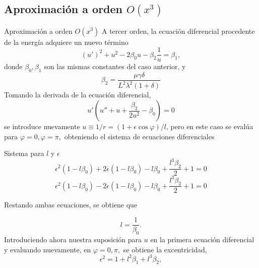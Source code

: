 \documentclass{beamer}
\begin{document}
	\subsection{Aproximación a orden $O(x^3)$}
	\begin{frame}[allowframebreaks]{Aproximación a orden $O(x^3)$}
	A tercer orden, la ecuación diferencial procedente de la energía adquiere un nuevo término
	\begin{equation}
		(u')^2+u^2-2\beta_0 u-\beta_2\frac{1}{u}=\beta_1,
	\end{equation}
	donde $\beta_0, \beta_1$ son las mismas constantes del caso anterior, y
	$$\beta_2=\frac{\mu\gamma\delta}{L^2\lambda^2(1+\delta)}$$
	Tomando la derivada de la ecuación diferencial,
	\begin{equation}
		u'(u''+u+\frac{\beta_2}{2u^2}-\beta_0)=0
	\end{equation}
	se introduce nuevamente $u\equiv 1/r=(1+\epsilon\cos\varphi)/l$, pero en este caso se evalúa para $\varphi=0,\varphi=\pi,$ obteniendo el sistema de ecuaciones diferenciales\vspace{10cm}
	\begin{block}{Sistema para $l$ y $\epsilon$}
				\begin{equation}
		\epsilon^2(1-l\beta_0)+2\epsilon(1-l\beta_0)-l\beta_0+\frac{l^3\beta_2}{2}+1=0
		\end{equation}
		\begin{equation}
		\epsilon^2(1-l\beta_0)-2\epsilon(1-l\beta_0)-l\beta_0+\frac{l^3\beta_2}{2}+1=0
		\end{equation}
	\end{block}
	Restando ambas ecuaciones, se obtiene que
	
	$$l=\frac{1}{\beta_0}.$$
	Introduciendo ahora nuestra suposición para $u$ en la primera ecuación diferencial y evaluando nuevamente, en $\varphi=0,\pi,$ se obtiene la excentricidad,
	$$\epsilon^2=1+l^2\beta_1+l^3\beta_2,$$
	

\end{frame}
\end{document}
